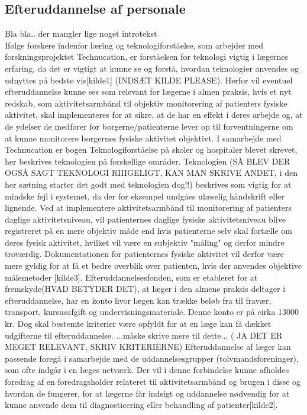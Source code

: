  
\subsection{Efteruddannelse af personale}
Bla bla.. der mangler lige noget introtekst\\

Ifølge forskere indenfor læring og teknologiforståelse, som arbejder med forskningsprojektet Technucation, er forståelsen for teknologi vigtig i lægernes erfaring, da det er vigtigt at kunne se og forstå, hvordan teknologier anvendes og udnyttes på bedste vis[kilde1] (INDSÆT KILDE PLEASE). Herfor vil eventuel efteruddannelse kunne ses som relevant for lægerne i almen praksis, hvis et nyt redskab, som aktivitetsarmbånd til objektiv monitorering af patienters fysiske aktivitet, skal implementeres for at sikre, at de har en effekt i deres arbejde og, at de ydelser de medfører for borgerne/patienterne lever op til forventningerne om at kunne monitorere borgernes fysiske aktivitet objektivt. I samarbejde med Technucation er bogen Teknologiforståelse på skoler og hospitaler blevet skrevet, her beskrives teknologien på forskellige områder. Teknologien (SÅ BLEV DER OGSÅ SAGT TEKNOLOGI RIIIGELIGT, KAN MAN SKRIVE ANDET, i den her sætning starter det godt med teknologien dog!!) beskrives som vigtig for at mindske fejl i systemet, da der for eksempel undgåes ulæselig håndskrift eller lignende. Ved at implementere aktivitetsarmbånd til monitorering af patienters daglige aktivitetsniveau, vil patienternes daglige fysiske aktivitetsniveau blive registreret på en mere objektiv måde end hvis patienterne selv skal fortælle om deres fysisk aktivitet, hvilket vil være en subjektiv "måling" og derfor mindre troværdig. Dokumentationen for patienternes fysiske aktivitet vil derfor være mere gyldig for at få et bedre overblik over patienten, hvis der anvendes objektive målemetoder [kilde3]. 
Efteruddannelsesfonden, som er etableret for at fremskyde(HVAD BETYDER DET), at læger i den almene praksis deltager i efteruddannelse, har en konto hvor lægen kan trække beløb fra til fravær, transport, kursusafgift og undervisningsmateriale. Denne konto er på cirka 13000 kr. Dog skal bestemte kriterier være opfyldt for at en læge kan få dækket udgifterne til efteruddannelse. ...måske skrive  mere til dette... ( JA DET ER MEGET RELEVANT, SKRIV KRITERIERNE) Efteruddannelse af læger kan passende foregå i samarbejde med de uddannelsesgrupper (tolvmandsforeninger), som ofte indgår i en læges netværk. Der vil i denne forbindelse kunne afholdes foredrag af en foredragsholder relateret til aktivitetsarmbånd og brugen i disse og hvordan de fungerer, for at lægerne får indsigt og uddannelse nødvendig for at kunne anvende dem til diagnosticering eller behandling af patienter[kilde2]. 
\\
